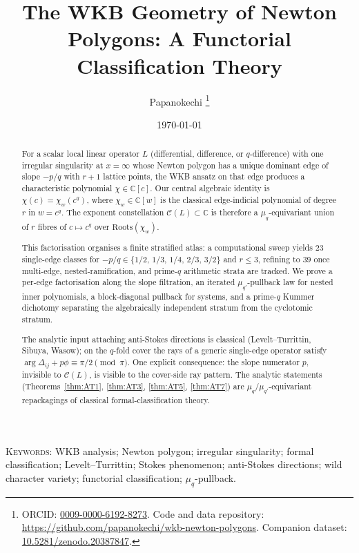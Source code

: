 \documentclass[aip,jmp,preprint,amsmath,amssymb,nofootinbib,floatfix]{revtex4-2}
\title{The WKB Geometry of Newton Polygons:
       A Functorial Classification Theory}
\author{Papanokechi%
  \thanks{ORCID:
  \href{https://orcid.org/0009-0000-6192-8273}{0009-0000-6192-8273}.
  Code and data repository:
  \url{https://github.com/papanokechi/wkb-newton-polygons}.
  Companion dataset:
  \href{https://doi.org/10.5281/zenodo.20387847}{10.5281/zenodo.20387847}.}%
}
\affiliation{Independent Researcher}
\date{\today}
\theoremstyle{plain}
\theoremstyle{definition}
\theoremstyle{remark}
\newcommand{\Roots}{\mathrm{Roots}}
\newcommand{\Cl}{\mathcal{C}}
\newcommand{\Dij}{\Delta_{ij}}
\begin{document}
\maketitle

\begin{abstract}
For a scalar local linear operator $L$ (differential, difference, or
$q$-difference) with one irregular singularity at $x = \infty$ whose
Newton polygon has a unique dominant edge of slope $-p/q$ with $r{+}1$
lattice points, the WKB ansatz on that edge produces a characteristic
polynomial $\chi \in \mathbb{C}[c]$. Our central algebraic identity is $\chi(c) = \chi_w(c^q)$, where $\chi_w \in \mathbb{C}[w]$ is the classical edge-indicial polynomial
of degree $r$ in $w = c^q$. The exponent constellation
$\Cl(L) \subset \mathbb{C}$ is therefore a $\mu_q$-equivariant union of
$r$ fibres of $c \mapsto c^q$ over $\Roots(\chi_w)$.

This factorisation organises a finite stratified atlas: a computational
sweep yields $23$ single-edge classes for
$-p/q \in \{1/2,\,1/3,\,1/4,\,2/3,\,3/2\}$ and $r \le 3$, refining to
$39$ once multi-edge, nested-ramification, and prime-$q$ arithmetic
strata are tracked. We prove a per-edge factorisation along the slope
filtration, an iterated $\mu_{q'}$-pullback law for nested inner
polynomials, a block-diagonal pullback for systems, and a prime-$q$
Kummer dichotomy separating the algebraically independent stratum from
the cyclotomic stratum.

The analytic input attaching anti-Stokes directions is classical
(Levelt--Turrittin, Sibuya, Wasow); on the $q$-fold cover the rays of a
generic single-edge operator satisfy
$\arg \Dij + p\phi \equiv \pi/2 \pmod{\pi}$. One explicit consequence:
the slope numerator $p$, invisible to $\Cl(L)$, is visible to the
cover-side ray pattern. The analytic statements
(Theorems~\ref{thm:AT1}, \ref{thm:AT3}, \ref{thm:AT5}, \ref{thm:AT7})
are $\mu_q/\mu_{q'}$-equivariant repackagings of classical
formal-classification theory.
\end{abstract}

\bigskip
\noindent\textsc{Keywords:} WKB analysis; Newton polygon; irregular
singularity; formal classification; Levelt--Turrittin; Stokes phenomenon;
anti-Stokes directions; wild character variety; functorial classification;
$\mu_q$-pullback.
\end{document}
